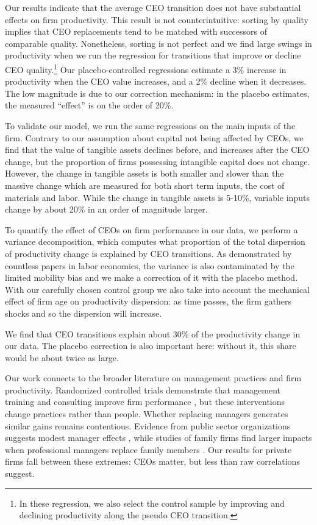 \documentclass[11pt,a4paper]{article}
\begin{document}
Our results indicate that the average CEO transition does not have substantial effects on firm productivity. This result is not counterintuitive: sorting by quality implies that CEO replacements tend to be matched with successors of comparable quality. Nonetheless, sorting is not perfect and we find large swings in productivity when we run the regression for transitions that improve or decline CEO quality.\footnote{In these regression, we also select the control sample by improving and declining productivity along the pseudo CEO transition.} Our placebo-controlled regressions estimate a 3\% increase in productivity when the CEO value increases, and a 2\% decline when it decreases. The low magnitude is due to our correction mechanism: in the placebo estimates, the measured ``effect'' is on the order of 20\%.  

To validate our model, we run the same regressions on the main inputs of the firm. Contrary to our assumption about capital not being affected by CEOs, we find that the value of tangible assets declines before, and increases after the CEO change, but the proportion of firms possessing intangible capital does not change. However, the change in tangible assets is both smaller and slower than the massive change which are measured for both short term inputs, the cost of materials and labor. While the change in tangible assets is 5-10\%, variable inputs change by about 20\% in an order of magnitude larger.

To quantify the effect of CEOs on firm performance in our data, we perform a variance decomposition, which computes what proportion of the total dispersion of productivity change is explained by CEO transitions. As demonstrated by countless papers in labor economics, the variance is also contaminated by the limited mobility bias and we make a correction of it with the  placebo method. With our carefully chosen control group we also take into account the mechanical effect of firm age on productivity dispersion: as time passes, the firm gathers shocks and so the dispersion will increase. 

We find that CEO transitions explain about 30\% of the productivity change in our data. The placebo correction is also important here: without it, this share would be about twice as large.

Our work connects to the broader literature on management practices and firm productivity. Randomized controlled trials demonstrate that management training and consulting improve firm performance \citep{bloom2013does, mckenzie2021small}, but these interventions change practices rather than people. Whether replacing managers generates similar gains remains contentious. Evidence from public sector organizations suggests modest manager effects \citep{fenizia2022managers, janke2024role}, while studies of family firms find larger impacts when professional managers replace family members \citep{bennedsen2007inside, sraer2007performance}. Our results for private firms fall between these extremes: CEOs matter, but less than raw correlations suggest.
\end{document}

